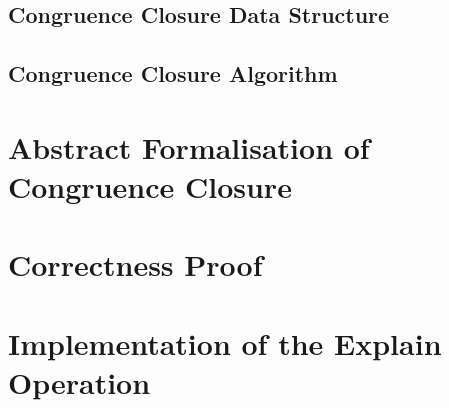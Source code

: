 \subsection{Congruence Closure Data Structure}

\subsection{Congruence Closure Algorithm}

\section{Abstract Formalisation of Congruence Closure}

\section{Correctness Proof}

\section{Implementation of the Explain Operation}
